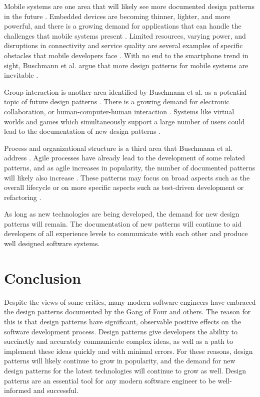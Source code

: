 \documentclass[11pt]{article}
\begin{document}
Mobile systems are one area that will likely see more documented design patterns in the future \cite{buschmann2007}. Embedded devices are becoming thinner, lighter, and more powerful, and there is a growing demand for applications that can handle the challenges that mobile systems present \cite{buschmann2007}. Limited resources, varying power, and disruptions in connectivity and service quality are several examples of specific obstacles that mobile developers face \cite{buschmann2007}. With no end to the smartphone trend in sight, Buschmann et al. argue that more design patterns for mobile systems are inevitable \cite{buschmann2007}. 

Group interaction is another area identified by Buschmann et al. as a potential topic of future design patterns \cite{buschmann2007}. There is a growing demand for electronic collaboration, or human-computer-human interaction \cite{buschmann2007}. Systems like virtual worlds and games which simultaneously support a large number of users could lead to the documentation of new design patterns \cite{buschmann2007}.

Process and organizational structure is a third area that Buschmann et al. address \cite{buschmann2007}. Agile processes have already lead to the development of some related patterns, and as agile increases in popularity, the number of documented patterns will likely also increase \cite{buschmann2007}. These patterns may focus on broad aspects such as the overall lifecycle or on more specific aspects such as test-driven development or refactoring \cite{buschmann2007}.

As long as new technologies are being developed, the demand for new design patterns will remain. The documentation of new patterns will continue to aid developers of all experience levels to communicate with each other and produce well designed software systems.

\section{Conclusion}

Despite the views of some critics, many modern software engineers have embraced the design patterns documented by the Gang of Four and others. The reason for this is that design patterns have significant, observable positive effects on the software development process. Design patterns give developers the ability to succinctly and accurately communicate complex ideas, as well as a path to implement these ideas quickly and with minimal errors. For these reasons, design patterns will likely continue to grow in popularity, and the demand for new design patterns for the latest technologies will continue to grow as well. Design patterns are an essential tool for any modern software engineer to be well-informed and successful.

\begin{singlespace}



\end{singlespace}
\end{document}
